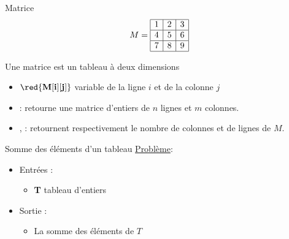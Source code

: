 \begin{frame}{Matrice}
  $$M =
  \begin{array}{|c|c|c|}
    \hline
    1 & 2 & 3 \\
    \hline
    4 & 5 & 6 \\
    \hline
    7 & 8 & 9 \\
    \hline
  \end{array}
  $$

  Une matrice est un tableau à deux dimensions
  \begin{itemize}
  \item ${\red{\mathbf{M[i][j]}}}$ variable de la ligne $i$ et de la colonne $j$
  \item {} : retourne une
    matrice d'entiers de $n$ lignes et $m$ colonnes. 
     \item {}, {} :
       retournent respectivement le nombre de colonnes et de lignes de
       $M$. 
  \end{itemize}
\end{frame}




\begin{frame}{Somme des éléments d'un tableau}
  \underline{Problème}:
  \begin{itemize}
  \item Entrées :
    \begin{itemize}
    \item \textbf{T} tableau d'entiers
    \end{itemize}
  \item Sortie : 
    \begin{itemize}
    \item La somme des éléments de $T$
    \end{itemize}
  \end{itemize}
\end{frame}

